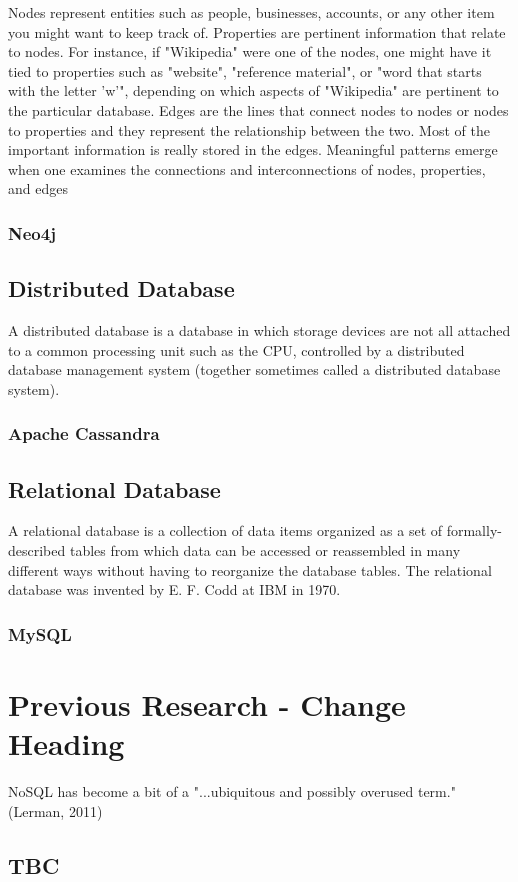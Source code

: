 Nodes represent entities such as people, businesses, accounts, or any other item you might want to keep track of. Properties are pertinent information that relate to nodes. For instance, if "Wikipedia" were one of the nodes, one might have it tied to properties such as "website", "reference material", or "word that starts with the letter 'w'", depending on which aspects of "Wikipedia" are pertinent to the particular database. Edges are the lines that connect nodes to nodes or nodes to properties and they represent the relationship between the two. Most of the important information is really stored in the edges. Meaningful patterns emerge when one examines the connections and interconnections of nodes, properties, and edges
\subsubsection{Neo4j}\label{neo}

\subsection{Distributed Database}
A distributed database is a database in which storage devices are not all attached to a common processing unit such as the CPU, controlled by a distributed database management system (together sometimes called a distributed database system).
\subsubsection{Apache Cassandra}\label{cassandra}

\subsection{Relational Database}
A relational database is a collection of data items organized as a set of formally-described tables from which data can be accessed or reassembled in many different ways without having to reorganize the database tables. The relational database was invented by E. F. Codd at IBM in 1970.
\subsubsection{MySQL}\label{mysql}

\section{Previous Research - Change Heading}
NoSQL has become a bit of a "...ubiquitous and possibly overused term." (Lerman, 2011)
\subsection{TBC}